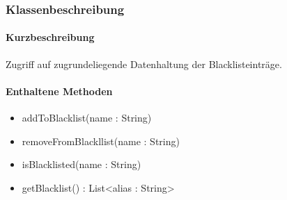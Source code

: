 \subsubsection*{Klassenbeschreibung}%
\paragraph*{Kurzbeschreibung}
Zugriff auf zugrundeliegende Datenhaltung der Blacklisteinträge.
\paragraph*{Enthaltene Methoden}
\begin{itemize}
    \item addToBlacklist(name : String)
    \item removeFromBlackllist(name : String)
    \item isBlacklisted(name : String)
    \item getBlacklist() : List<alias : String>
\end{itemize}
